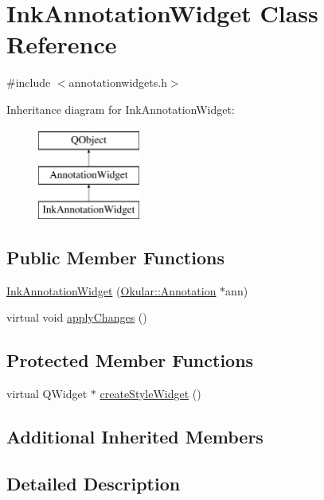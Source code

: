 \hypertarget{classInkAnnotationWidget}{\section{Ink\+Annotation\+Widget Class Reference}
\label{classInkAnnotationWidget}
}


{\ttfamily \#include $<$annotationwidgets.\+h$>$}

Inheritance diagram for Ink\+Annotation\+Widget\+:\begin{figure}[H]
\begin{center}
\leavevmode
\includegraphics[height=3.000000cm]{classInkAnnotationWidget}
\end{center}
\end{figure}
\subsection*{Public Member Functions}
\begin{DoxyCompactItemize}
\item 
\hyperlink{classInkAnnotationWidget_ad913b8bc60faa202795ce63195eecb7d}{Ink\+Annotation\+Widget} (\hyperlink{classOkular_1_1Annotation}{Okular\+::\+Annotation} $\ast$ann)
\item 
virtual void \hyperlink{classInkAnnotationWidget_a531cf1b8d9d7765f2b9aadc862e2d0e3}{apply\+Changes} ()
\end{DoxyCompactItemize}
\subsection*{Protected Member Functions}
\begin{DoxyCompactItemize}
\item 
virtual Q\+Widget $\ast$ \hyperlink{classInkAnnotationWidget_a747041049c853793b8ef2d86a192d866}{create\+Style\+Widget} ()
\end{DoxyCompactItemize}
\subsection*{Additional Inherited Members}


\subsection{Detailed Description}


